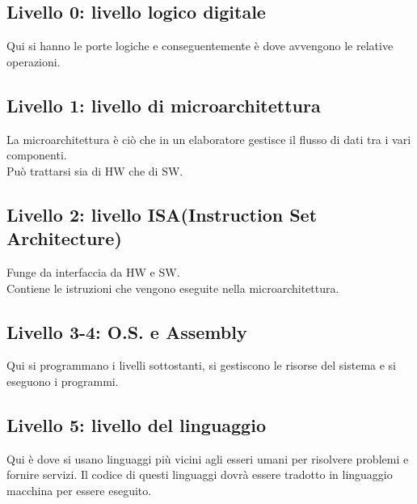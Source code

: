 \documentclass[12pt]{article}
\begin{document}
\subsection{Livello 0: livello logico digitale}
Qui si hanno le porte logiche e conseguentemente è dove avvengono le relative operazioni.
\subsection{Livello 1: livello di microarchitettura}
La microarchitettura è ciò che in un elaboratore gestisce il flusso di dati tra i vari componenti.\\
Può trattarsi sia di HW che di SW.
\subsection{Livello 2: livello ISA(Instruction Set Architecture)}
Funge da interfaccia da HW e SW.\\
Contiene le istruzioni che vengono eseguite nella microarchitettura.
\subsection{Livello 3-4: O.S. e Assembly}
Qui si programmano i livelli sottostanti, si gestiscono le risorse del sistema e si eseguono i programmi.
\subsection{Livello 5: livello del linguaggio}
Qui è dove si usano linguaggi più vicini agli esseri umani per risolvere problemi e fornire servizi. Il codice di questi linguaggi dovrà essere tradotto in linguaggio macchina per essere eseguito. 
\end{document}
